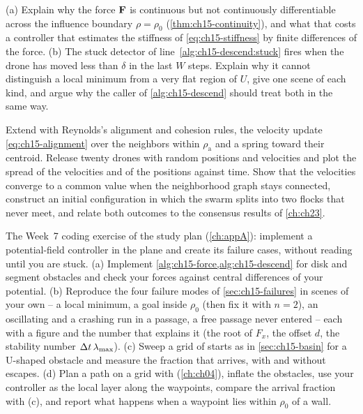 \begin{exercise}[\difficulty{1}]
\label{exr:ch15-smoothness}
(a) Explain why the force $\mathbf{F}$ is continuous but not continuously
differentiable across the influence boundary $\rho = \rho_0$
(\cref{thm:ch15-continuity}), and what that costs a controller that estimates
the stiffness of \cref{eq:ch15-stiffness} by finite differences of the force.
(b) The stuck detector of line~\ref{alg:ch15-descend:stuck} fires when the
drone has moved less than $\delta$ in the last $W$ steps. Explain why it cannot
distinguish a local minimum from a very flat region of $U$, give one scene of
each kind, and argue why the caller of \cref{alg:ch15-descend} should treat
both in the same way.
\end{exercise}

\begin{exercise}
\label{exr:ch15-flocking}
Extend  with Reynolds's alignment and cohesion
rules, the velocity update \cref{eq:ch15-alignment} over the neighbors
within $\rho_{\mathrm{a}}$ and a spring toward their centroid. Release
twenty drones with random positions and velocities and plot the spread of
the velocities and of the positions against time. Show that the
velocities converge to a common value when the neighborhood graph stays
connected, construct an initial configuration in which the swarm splits into
two flocks that never meet, and relate both outcomes to the consensus results
of \cref{ch:ch23}.
\end{exercise}

\begin{exercise}
\label{exr:ch15-coding}
The Week~7 coding exercise of the study plan (\cref{ch:appA}): implement a
potential-field controller in the plane and create its failure cases, without
reading  until you are stuck. (a) Implement \cref{alg:ch15-force,alg:ch15-descend}
for disk and segment obstacles and check your forces against central
differences of your potential. (b) Reproduce the four
failure modes of \cref{sec:ch15-failures} in scenes of your own -- a local
minimum, a goal inside $\rho_0$ (then fix it with $n = 2$), an oscillating and
a crashing run in a passage, a free passage never entered -- each with a figure
and the number that explains it (the root of $F_x$, the
offset $d$, the stability number $\Delta t\,\lambda_{\max}$). (c)
Sweep a grid of starts as in \cref{sec:ch15-basin} for a U-shaped obstacle
and measure the fraction that arrives, with and without escapes. (d) Plan a path on a grid with \astar (\cref{ch:ch04}),
inflate the obstacles, use your controller as the local layer along the
waypoints, compare the arrival fraction with (c), and report what happens
when a waypoint lies within $\rho_0$ of a wall.
\end{exercise}

